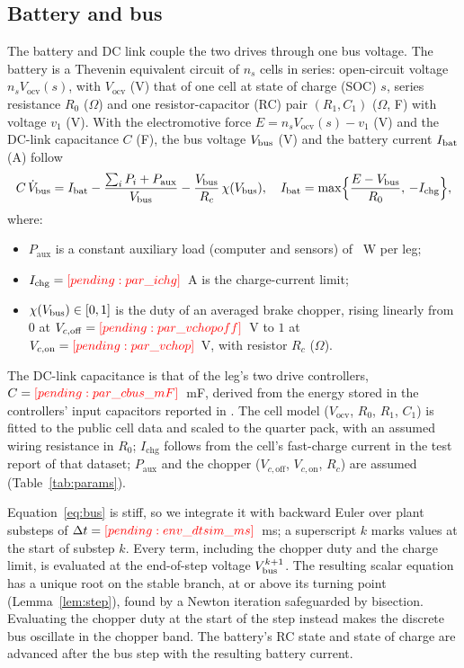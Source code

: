 \subsection{Battery and bus}
The battery and DC link couple the two drives through one bus voltage. The battery is a Thevenin equivalent circuit of $n_s$ cells in series: open-circuit voltage $n_s V_{\mathrm{ocv}}(s)$, with $V_{\mathrm{ocv}}$ (V) that of one cell at state of charge (SOC) $s$, series resistance $R_0$ ($\Omega$) and one resistor-capacitor (RC) pair $(R_1, C_1)$ ($\Omega$, F) with voltage $v_1$ (V). With the electromotive force $E = n_s V_{\mathrm{ocv}}(s) - v_1$ (V) and the DC-link capacitance $C$ (F), the bus voltage $V_{\mathrm{bus}}$ (V) and the battery current $I_{\mathrm{bat}}$ (A) follow
\begin{equation}
C\,\dot V_{\mathrm{bus}} = I_{\mathrm{bat}} - \frac{\sum_i P_i + P_{\mathrm{aux}}}{V_{\mathrm{bus}}} - \frac{V_{\mathrm{bus}}}{R_c}\,\chi(V_{\mathrm{bus}}), \quad
I_{\mathrm{bat}} = \max\Bigl\{\frac{E-V_{\mathrm{bus}}}{R_0},\, -I_{\mathrm{chg}}\Bigr\},
\label{eq:bus}
\end{equation}
where:
\begin{itemize}
\item $P_{\mathrm{aux}}$ is a constant auxiliary load (computer and sensors) of ~W per leg;
\item $I_{\mathrm{chg}}=\res{par_ichg}$~A is the charge-current limit;
\item $\chi(V_{\mathrm{bus}})\in[0,1]$ is the duty of an averaged brake chopper, rising linearly from $0$ at $V_{c,\mathrm{off}}=\res{par_vchopoff}$~V to $1$ at $V_{c,\mathrm{on}}=\res{par_vchop}$~V, with resistor $R_c$ ($\Omega$).
\end{itemize}
The DC-link capacitance is that of the leg's two drive controllers, $C=\res{par_cbus_mF}$~mF, derived from the energy stored in the controllers' input capacitors reported in \cite{katz2018actuator}. The cell model ($V_{\mathrm{ocv}}$, $R_0$, $R_1$, $C_1$) is fitted to the public cell data \cite{kollmeyer2020hg2} and scaled to the quarter pack, with an assumed wiring resistance in $R_0$; $I_{\mathrm{chg}}$ follows from the cell's fast-charge current in the test report of that dataset; $P_{\mathrm{aux}}$ and the chopper ($V_{c,\mathrm{off}}$, $V_{c,\mathrm{on}}$, $R_c$) are assumed (Table~\ref{tab:params}).

Equation~\eqref{eq:bus} is stiff, so we integrate it with backward Euler over plant substeps of $\Delta t = \res{env_dtsim_ms}$~ms; a superscript $k$ marks values at the start of substep $k$. Every term, including the chopper duty and the charge limit, is evaluated at the end-of-step voltage $V_{\mathrm{bus}}^{k+1}$. The resulting scalar equation has a unique root on the stable branch, at or above its turning point (Lemma~\ref{lem:step}), found by a Newton iteration safeguarded by bisection. Evaluating the chopper duty at the start of the step instead makes the discrete bus oscillate in the chopper band. The battery's RC state and state of charge are advanced after the bus step with the resulting battery current.

